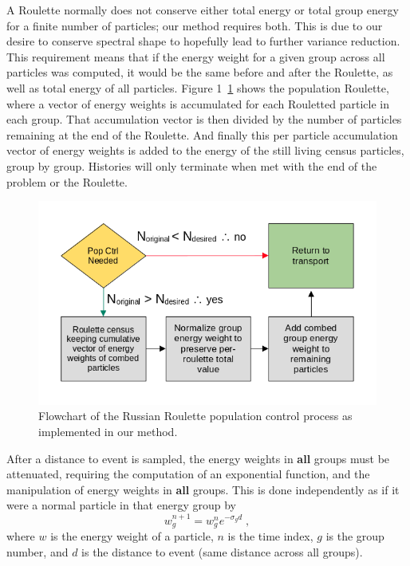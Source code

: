 A Roulette normally does not conserve either total energy or total group energy for a finite number of particles; our method requires both. 
This is due to our desire to conserve spectral shape to hopefully lead to further variance reduction.
This requirement means that if the energy weight for a given group across all particles was computed, it would be the same before and after the Roulette, as well as total energy of all particles.
Figure 1~\ref{fig:roulette} shows the population Roulette, where a vector of energy weights is accumulated for each Rouletted particle in each group. That accumulation vector is then divided by the number of particles remaining at the end of the Roulette. And finally this per particle accumulation vector of energy weights is added to the energy of the still living census particles, group by group.
Histories will only terminate when met with the end of the problem or the Roulette.

\begin{figure}
    \begin{center}
        \includegraphics[width=.75\textwidth]{appendix/trt_figs/flow_chart.png}
        \caption{Flowchart of the Russian Roulette population control process as implemented in our method.}
        \label{fig:roulette}
    \end{center}
\end{figure}

After a distance to event is sampled, the energy weights in \textbf{all} groups must be attenuated, requiring the computation of an exponential function, and the manipulation of energy weights in \textbf{all} groups.
This is done independently as if it were a normal particle in that energy group by
\begin{equation}
    w_g^{n+1} = w_g^n e^{-\sigma_g  d} \;,
\end{equation}
where $w$ is the energy weight of a particle, $n$ is the time index, $g$ is the group number, and $d$ is the distance to event (same distance across all groups).

